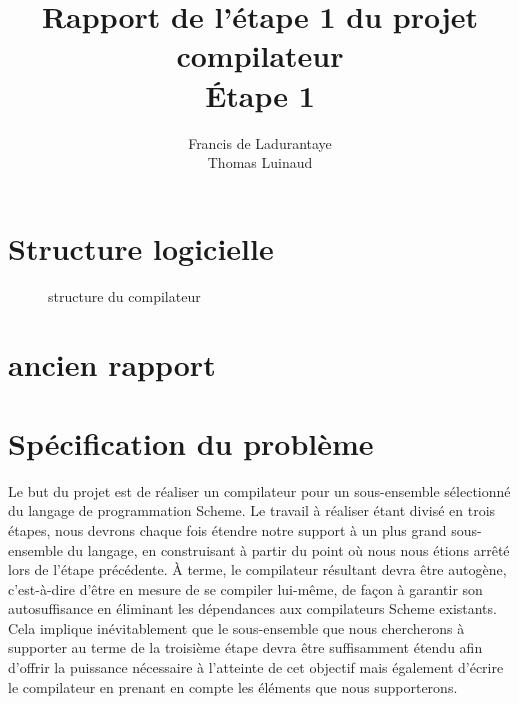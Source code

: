 \documentclass[12pt]{article}
\title{Rapport de l'étape 1 du projet compilateur \\ Étape 1}
\author{Francis de Ladurantaye \\ Thomas Luinaud}
\begin{document}
\begin{titlepage}
  \maketitle
\end{titlepage}

\section{Structure logicielle}
\begin{figure}[h]
	\caption{structure du compilateur}
\end{figure}

\newpage
\section{ancien rapport}
\section{Spécification du problème}
Le but du projet est de réaliser un compilateur pour un sous-ensemble sélectionné du langage de programmation Scheme. Le travail à réaliser étant divisé en trois étapes, nous devrons chaque fois étendre notre support à un plus grand sous-ensemble du langage, en construisant à partir du point où nous nous étions arrêté lors de l'étape précédente. À terme, le compilateur résultant devra être autogène, c'est-à-dire d'être en mesure de se compiler lui-même, de façon à garantir son autosuffisance en éliminant les dépendances aux compilateurs Scheme existants. Cela implique inévitablement que le sous-ensemble que nous chercherons à supporter au terme de la troisième étape devra être suffisamment étendu afin d'offrir la puissance nécessaire à l'atteinte de cet objectif mais également d'écrire le compilateur en prenant en compte les éléments que nous supporterons.
\end{document}
